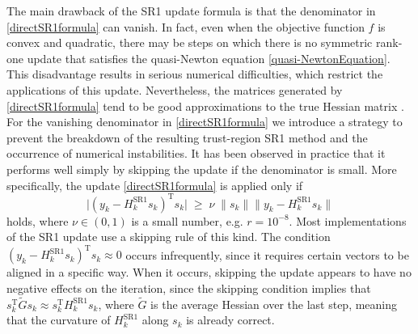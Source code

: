 The main drawback of the SR1 update formula is that the denominator in \cref{directSR1formula} can vanish. In fact, even when the objective function $f$ is convex and quadratic, there may be steps on which there is no symmetric rank-one update that satisfies the quasi-Newton equation \cref{quasi-NewtonEquation}. This disadvantage results in serious numerical difficulties, which restrict the applications of this update. Nevertheless, the matrices generated by \cref{directSR1formula} tend to be good approximations to the true Hessian matrix \cite[p.~145]{NocedalWright:2006}. \\
For the vanishing denominator in \cref{directSR1formula} we introduce a strategy to prevent the breakdown of the resulting trust-region SR1 method and the occurrence of numerical instabilities. It has been observed in practice that it performs well simply by skipping the update if the denominator is small. More specifically, the update \cref{directSR1formula} is applied only if 
\begin{equation}\label{safeguard}
    \lvert (y_k - H^\mathrm{SR1}_k s_k)^{\mathrm{T}} s_k \lvert \; \geq \; \nu \; \lVert s_k \rVert \lVert y_k - H^\mathrm{SR1}_k s_k \rVert 
\end{equation}
holds, where $\nu \in (0, 1)$ is a small number, e.g. $r = 10^{−8}$. Most implementations of the SR1 update use a skipping rule of this kind. The condition $(y_k - H^\mathrm{SR1}_k s_k)^{\mathrm{T}} s_k \approx 0$ occurs infrequently, since it requires certain vectors to be aligned in a specific way. When it occurs, skipping the update appears to have no negative effects on the iteration, since the skipping condition implies that $s^{\mathrm{T}}_k \tilde{G} s_k \approx s^{\mathrm{T}}_k H^\mathrm{SR1}_k s_k$, where $\tilde{G}$ is the average Hessian over the last step, meaning that the curvature of $H^\mathrm{SR1}_k$ along $s_k$ is already correct. \\

